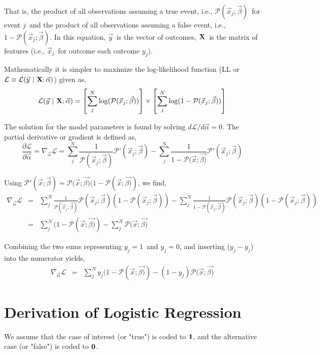 \documentclass[11pt, oneside]{article}   	%
\newcommand{\vxj}{\vec{x}_{j}}
\newcommand{\bx}{{\bf{X}}}
\newcommand{\vy}{\vec{y}}
\newcommand{\yj}{y_{j}}
\newcommand{\va}{\vec{\alpha}}
\newcommand{\px}{\mathcal{P}(\vec{x};\vec{\beta)}}
\newcommand{\pxj}{\mathcal{P}(\vec{x}_{j};\vec{\beta})}
\newcommand{\dpx}{\mathcal{P}'(\vec{x};\vec{\beta})}
\newcommand{\dpxj}{\mathcal{P}'(\vec{x}_{j};\vec{\beta})}
\begin{document}
That is, the product of all observations assuming a true event, i.e., $\pxj$~for event $j$~and the product of all observations assuming a false event, i.e., $1-\pxj$. In this equation, $\vy$~is the vector of outcomes, $\bx$~is the matrix of features (i.e., $\vxj$~for outcome each outcome $\yj$).

Mathematically it is simpler to maximize the log-likelihood function (LL or $\mathcal{L} \equiv \mathcal{L}(\vy~|~\bx;\va)$) given as,
\begin{equation}
\mathcal{L}(\vy~|~\bx;\va) = \left[ \sum_{j}^{N} \log (\pxj) \right] \times \left[ \sum_{j}^{N} \log(1 - \pxj) \right]
\end{equation}

The solution for the model parameters is found by solving $d\mathcal{L}/d{\vec{\alpha}} = 0$. The partial derivative or gradient is defined as,
\begin{equation}
\frac{ \partial \mathcal{L} }{ \partial \vec{\alpha} } = \nabla_{\vec{\alpha}} \mathcal{L} = \sum_{j}^{N} \frac{1}{\pxj} \dpxj - \sum_{j}^{N} \frac{1}{1-\px} \dpxj
\end{equation}

Using $\dpx = \px(1-\px)$, we find,
\begin{eqnarray*}
\nabla_{\va} \mathcal{L}	&=& \sum_{j}^{N} \frac{1}{\pxj} \pxj(1-\pxj) - \sum_{j}^{N} \frac{1}{1-\pxj} \pxj(1-\pxj) \nonumber \\
							&=& \sum_{j}^{N} (1-\px) - \sum_{j}^{N} \px
\end{eqnarray*}

Combining the two sums representing $\yj=1$~and $\yj=0$, and inserting ($\yj - \yj$) into the numerator yields,
\begin{eqnarray*}
\nabla_{\va} \mathcal{L} &=&  \sum_{j}^{N} \yj(1-\px) - (1-\yj)\px
\end{eqnarray*}

\section{Derivation of Logistic Regression}
We assume that the case of interest (or "true") is coded to $\bf{1}$, and the alternative case (or "false") is coded to $\bf{0}$.
\end{document}
